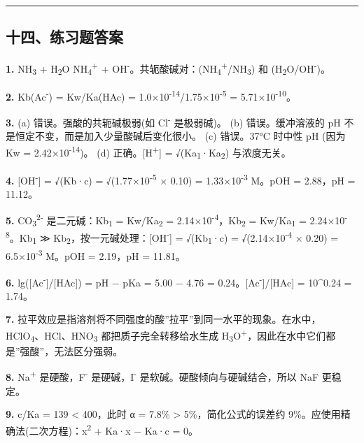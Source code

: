 \begin{center}\rule{0.5\linewidth}{0.5pt}\end{center}

\subsection{十四、练习题答案}\label{ux5341ux56dbux7ec3ux4e60ux9898ux7b54ux6848}

\textbf{1.} NH\textsubscript{3} + H\textsubscript{2}O \衡 NH\textsubscript{4}\textsuperscript{+} + OH\textsuperscript{-}。共轭酸碱对：(NH\textsubscript{4}\textsuperscript{+}/NH\textsubscript{3}) 和 (H\textsubscript{2}O/OH\textsuperscript{-})。

\textbf{2.} Kb(Ac\textsuperscript{-}) = Kw/Ka(HAc) = 1.0×10\textsuperscript{-14}/1.75×10\textsuperscript{-5} = 5.71×10\textsuperscript{-10}。

\textbf{3.}
(a) 错误。强酸的共轭碱极弱(如 Cl\textsuperscript{-} 是极弱碱)。
(b) 错误。缓冲溶液的 pH 不是恒定不变，而是加入少量酸碱后变化很小。
(c) 错误。37°C 时中性 pH (因为 Kw = 2.42×10\textsuperscript{-14})。
(d) 正确。{[}H\textsuperscript{+}{]} = √(Ka\textsubscript{1}·Ka\textsubscript{2}) 与浓度无关。

\textbf{4.} {[}OH\textsuperscript{-}{]} = √(Kb·c) = √(1.77×10\textsuperscript{-5} × 0.10) = 1.33×10\textsuperscript{-3} M。pOH = 2.88，pH = 11.12。

\textbf{5.} CO\textsubscript{3}\textsuperscript{2-} 是二元碱：Kb\textsubscript{1} = Kw/Ka\textsubscript{2} = 2.14×10\textsuperscript{-4}，Kb\textsubscript{2} = Kw/Ka\textsubscript{1} = 2.24×10\textsuperscript{-8}。Kb\textsubscript{1} ≫ Kb\textsubscript{2}，按一元碱处理：{[}OH\textsuperscript{-}{]} = √(Kb\textsubscript{1}·c) = √(2.14×10\textsuperscript{-4} × 0.20) = 6.5×10\textsuperscript{-3} M。pOH = 2.19，pH = 11.81。

\textbf{6.} lg({[}Ac\textsuperscript{-}{]}/{[}HAc{]}) = pH − pKa = 5.00 − 4.76 = 0.24。{[}Ac\textsuperscript{-}{]}/{[}HAc{]} = 10\^{}0.24 = 1.74。

\textbf{7.} 拉平效应是指溶剂将不同强度的酸''拉平''到同一水平的现象。在水中，HClO\textsubscript{4}、HCl、HNO\textsubscript{3} 都把质子完全转移给水生成 H\textsubscript{3}O\textsuperscript{+}，因此在水中它们都是''强酸''，无法区分强弱。

\textbf{8.} Na\textsuperscript{+} 是硬酸，F\textsuperscript{-} 是硬碱，I\textsuperscript{-} 是软碱。硬酸倾向与硬碱结合，所以 NaF 更稳定。

\textbf{9.} c/Ka = 139 \textless{} 400，此时 α = 7.8\% \textgreater{} 5\%，简化公式的误差约 9\%。应使用精确法(二次方程)：x\textsuperscript{2} + Ka·x − Ka·c = 0。

